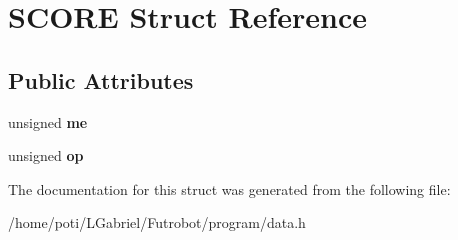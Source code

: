 \hypertarget{structSCORE}{}\section{S\+C\+O\+RE Struct Reference}
\label{structSCORE}
\subsection*{Public Attributes}
\begin{DoxyCompactItemize}
\item 
unsigned {\bfseries me}\hypertarget{structSCORE_a1d59d3923573ccda35bd1df5b107e9dc}{}\label{structSCORE_a1d59d3923573ccda35bd1df5b107e9dc}

\item 
unsigned {\bfseries op}\hypertarget{structSCORE_ab0e5449462f347933fb8fadeaeae6002}{}\label{structSCORE_ab0e5449462f347933fb8fadeaeae6002}

\end{DoxyCompactItemize}


The documentation for this struct was generated from the following file\+:\begin{DoxyCompactItemize}
\item 
/home/poti/\+L\+Gabriel/\+Futrobot/program/data.\+h\end{DoxyCompactItemize}
